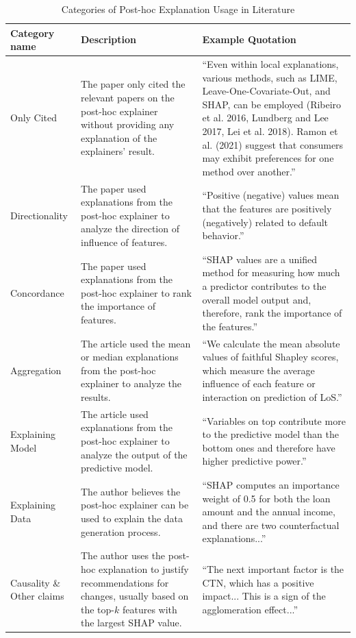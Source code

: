 \documentclass[mnsc,blindrev]{informs3}
\begin{document}
\begin{table}[htbp]
\scriptsize
    \centering
    \caption{Categories of Post-hoc Explanation Usage in Literature}
    \label{tab:explanation_categories}
    \begin{tabular}{p{3cm}p{6cm}p{7cm}}
        \toprule
        \textbf{Category name} & \textbf{Description} & \textbf{Example Quotation} \\
        \midrule
        Only Cited & The paper only cited the relevant papers on the post-hoc explainer without providing any explanation of the explainers' result. & ``Even within local explanations, various methods, such as LIME, Leave-One-Covariate-Out, and SHAP, can be employed (Ribeiro et al. 2016, Lundberg and Lee 2017, Lei et al. 2018). Ramon et al. (2021) suggest that consumers may exhibit preferences for one method over another.'' \\
        \addlinespace
        Directionality & The paper used explanations from the post-hoc explainer to analyze the direction of influence of features. & ``Positive (negative) values mean that the features are positively (negatively) related to default behavior.'' \\
        \addlinespace
        Concordance & The paper used explanations from the post-hoc explainer to rank the importance of features. & ``SHAP values are a unified method for measuring how much a predictor contributes to the overall model output and, therefore, rank the importance of the features.'' \\
        \addlinespace
        Aggregation & The article used the mean or median explanations from the post-hoc explainer to analyze the results. & ``We calculate the mean absolute values of faithful Shapley scores, which measure the average influence of each feature or interaction on prediction of LoS.'' \\
        \addlinespace
        Explaining Model & The article used explanations from the post-hoc explainer to analyze the output of the predictive model. & ``Variables on top contribute more to the predictive model than the bottom ones and therefore have higher predictive power.'' \\
        \addlinespace
        Explaining Data & The author believes the post-hoc explainer can be used to explain the data generation process. & ``SHAP computes an importance weight of 0.5 for both the loan amount and the annual income, and there are two counterfactual explanations...'' \\
        \addlinespace
        Causality \& Other claims & The author uses the post-hoc explanation to justify recommendations for changes, usually based on the top-$k$ features with the largest SHAP value. & ``The next important factor is the CTN, which has a positive impact... This is a sign of the agglomeration effect...'' \\
        \bottomrule
    \end{tabular}
\end{table}
\end{document}
